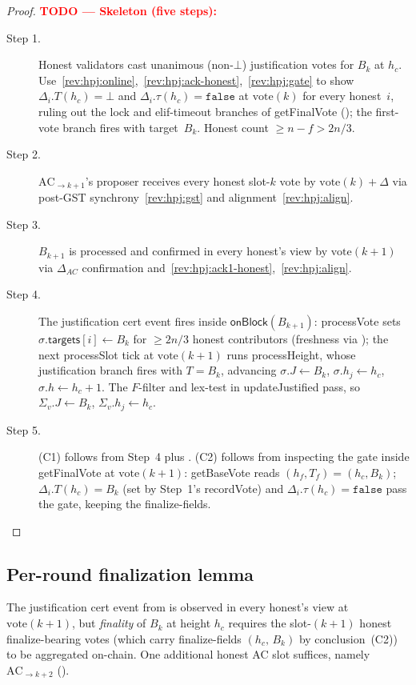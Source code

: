 \documentclass{article}
\newcommand{\targets}{\mathsf{targets}}
\newcommand{\processSlot}{\textsf{processSlot}\xspace}
\newcommand{\processHeight}{\textsf{processHeight}\xspace}
\newcommand{\processVote}{\textsf{processVote}\xspace}
\newcommand{\vote}{\ensuremath{\mathrm{vote}}}
\newcommand{\getBaseVote}{\textsf{getBaseVote}\xspace}
\newcommand{\getFinalVote}{\textsf{getFinalVote}\xspace}
\newcommand{\recordVote}{\textsf{recordVote}\xspace}
\newcommand{\onBlock}{\textsf{onBlock}\xspace}
\newcommand{\updateJustified}{\textsf{updateJustified}\xspace}
\theoremstyle{plain}
\theoremstyle{definition}
\theoremstyle{remark}
\begin{document}
\begin{proof}
\textcolor{red}{\textbf{TODO --- Skeleton (five steps):}}
\begin{description}
\item[Step 1.] Honest validators cast unanimous (non-$\bot$) justification votes for $B_k$ at $h_c$. Use~\ref{rev:hpj:online},~\ref{rev:hpj:ack-honest},~\ref{rev:hpj:gate} to show $\Delta_i.T(h_c) = \bot$ and $\Delta_i.\tau(h_c) = \mathtt{false}$ at $\vote(k)$ for every honest~$i$, ruling out the lock and elif-timeout branches of \getFinalVote{} (); the first-vote branch fires with target~$B_k$. Honest count $\geq n - f > 2n/3$.
\item[Step 2.] $\mathrm{AC}_{\to k+1}$'s proposer receives every honest slot-$k$ vote by $\vote(k) + \Delta$ via post-GST synchrony~\ref{rev:hpj:gst} and alignment~\ref{rev:hpj:align}.
\item[Step 3.] $B_{k+1}$ is processed and confirmed in every honest's view by $\vote(k+1)$ via $\Delta_{\mathit{AC}}$ confirmation and~\ref{rev:hpj:ack1-honest},~\ref{rev:hpj:align}.
\item[Step 4.] The justification cert event fires inside $\onBlock(B_{k+1})$: \processVote{} sets $\sigma.\targets[i] \gets B_k$ for $\geq 2n/3$ honest contributors (freshness via ); the next \processSlot{} tick at $\vote(k+1)$ runs \processHeight{}, whose justification branch fires with $T = B_k$, advancing $\sigma.J \gets B_k$, $\sigma.h_j \gets h_c$, $\sigma.h \gets h_c + 1$. The $F$-filter and lex-test in \updateJustified{} pass, so $\Sigma_v.J \gets B_k$, $\Sigma_v.h_j \gets h_c$.
\item[Step 5.] (C1) follows from Step~4 plus . (C2) follows from inspecting the gate inside \getFinalVote{} at $\vote(k+1)$: \getBaseVote{} reads $(h_f, T_f) = (h_c, B_k)$; $\Delta_i.T(h_c) = B_k$ (set by Step~1's \recordVote{}) and $\Delta_i.\tau(h_c) = \mathtt{false}$ pass the gate, keeping the finalize-fields.
\end{description}
\end{proof}

\subsection{Per-round finalization lemma}\label{sec:liveness-fin}

The justification cert event from  is observed in every honest's view at $\vote(k+1)$, but \emph{finality} of $B_k$ at height $h_c$ requires the slot-$(k+1)$ honest finalize-bearing votes (which carry finalize-fields $(h_c,\, B_k)$ by conclusion~(C2)) to be aggregated on-chain.
One additional honest AC slot suffices, namely $\mathrm{AC}_{\to k+2}$ ().
\end{document}
